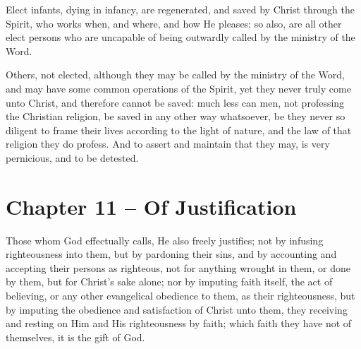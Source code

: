 \begin{outerlst}[left=0pt,labelsep=0pt]
\begin{innerlst}[resume*]
\item Elect infants, dying in infancy, are regenerated, and saved by Christ through the Spirit, who works when, and where, and how He pleases: so also, are all other elect persons who are uncapable of being outwardly called by the ministry of the Word.   

\item Others, not elected, although they may be called by the ministry of the Word, and may have some common operations of the Spirit, yet they never truly come unto Christ, and therefore cannot be saved: much less can men, not professing the Christian religion, be saved in any other way whatsoever, be they never so diligent to frame their lives according to the light of nature, and the law of that religion they do profess. And to assert and maintain that they may, is very pernicious, and to be detested.  
\end{innerlst}

\item
{}
\section{Chapter 11 -- Of Justification}
\begin{innerlst}[resume*]

\item Those whom God effectually calls, He also freely justifies; not by infusing righteousness into them, but by pardoning their sins, and by accounting and accepting their persons as righteous, not for anything wrought in them, or done by them, but for Christ's sake alone; nor by imputing faith itself, the act of believing, or any other evangelical obedience to them, as their righteousness, but by imputing the obedience and satisfaction of Christ unto them, they receiving and resting on Him and His righteousness by faith; which faith they have not of themselves, it is the gift of God.   


\end{innerlst}
\end{outerlst}

